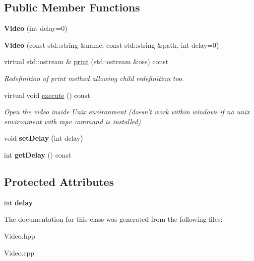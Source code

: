 \subsection*{Public Member Functions}
\begin{DoxyCompactItemize}
\item 
\hypertarget{class_video_a19f29b0c0efae6ce7a89f1ae61f81f70}{{\bfseries Video} (int delay=0)}\label{class_video_a19f29b0c0efae6ce7a89f1ae61f81f70}

\item 
\hypertarget{class_video_ae748826e2e68c45a2030258042832d08}{{\bfseries Video} (const std\-::string \&name, const std\-::string \&path, int delay=0)}\label{class_video_ae748826e2e68c45a2030258042832d08}

\item 
\hypertarget{class_video_a1bd10186658fb7399508bd43c3dc6c51}{virtual std\-::ostream \& \hyperlink{class_video_a1bd10186658fb7399508bd43c3dc6c51}{print} (std\-::ostream \&oss) const }\label{class_video_a1bd10186658fb7399508bd43c3dc6c51}

\begin{DoxyCompactList}\small\item\em Redefinition of print method allowing child redefinition too. \end{DoxyCompactList}\item 
\hypertarget{class_video_a591c7d2a74b0095373b5df4e20f38203}{virtual void \hyperlink{class_video_a591c7d2a74b0095373b5df4e20f38203}{execute} () const }\label{class_video_a591c7d2a74b0095373b5df4e20f38203}

\begin{DoxyCompactList}\small\item\em Open the video inside Unix environment (doesn't work within windows if no unix environment with mpv command is installed) \end{DoxyCompactList}\item 
\hypertarget{class_video_af4590349144352c253de21701d20c8fc}{void {\bfseries set\-Delay} (int delay)}\label{class_video_af4590349144352c253de21701d20c8fc}

\item 
\hypertarget{class_video_a0585044752fbca505f0f00ced0d535af}{int {\bfseries get\-Delay} () const }\label{class_video_a0585044752fbca505f0f00ced0d535af}

\end{DoxyCompactItemize}
\subsection*{Protected Attributes}
\begin{DoxyCompactItemize}
\item 
\hypertarget{class_video_a6ee93d1d2241dede568773d78547de64}{int {\bfseries delay}}\label{class_video_a6ee93d1d2241dede568773d78547de64}

\end{DoxyCompactItemize}


The documentation for this class was generated from the following files\-:\begin{DoxyCompactItemize}
\item 
Video.\-hpp\item 
Video.\-cpp\end{DoxyCompactItemize}
